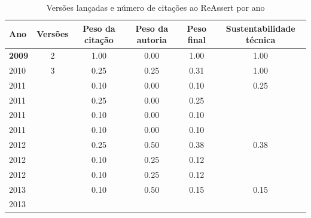 \begin{table}[H]
\caption{Versões lançadas e número de citações ao ReAssert por ano}
\centering
\begin{tabular}{| l | c | c | c | c | c |}
  \hline
  Ano & Versões & Peso da citação & Peso da autoria & Peso final & Sustentabilidade técnica \\
  \hline
            {\bf 2009}
          &
          2
          &
          1.00
          &
          0.00
          &
          1.00
          &
            {\color{blue} 1.00}
          \\
\hline
            2010
          &
          3
          &
          0.25
          &
          0.25
          &
          0.31
          &
            {\color{blue} 1.00}
          \\
\hline
            2011
          &
          
          &
          0.10
          &
          0.00
          &
          0.10
          &
            {\color{red} 0.25}
          \\
            2011
          &
          
          &
          0.25
          &
          0.00
          &
          0.25
          &
          \\
            2011
          &
          
          &
          0.10
          &
          0.00
          &
          0.10
          &
          \\
            2011
          &
          
          &
          0.10
          &
          0.00
          &
          0.10
          &
          \\
\hline
            2012
          &
          
          &
          0.25
          &
          0.50
          &
          0.38
          &
            {\color{red} 0.38}
          \\
            2012
          &
          
          &
          0.10
          &
          0.25
          &
          0.12
          &
          \\
            2012
          &
          
          &
          0.10
          &
          0.25
          &
          0.12
          &
          \\
\hline
            2013
          &
          
          &
          0.10
          &
          0.50
          &
          0.15
          &
            {\color{red} 0.15}
          \\
            2013
          &
          

\end{tabular}
\end{table}
